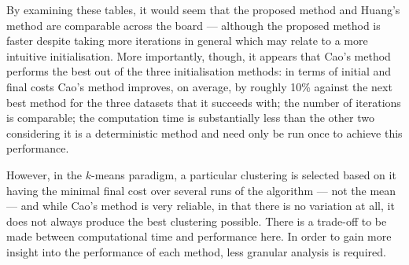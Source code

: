 \begin{table}
    \centering
    \resizebox{\textwidth}{!}{%
        
    }
    \label{tab:breast_cancer_knee}\vspace{2em}

    \resizebox{\textwidth}{!}{%
        
    }
    \label{tab:mushroom_knee}\vspace{2em}

    \resizebox{\textwidth}{!}{%
        
    }
    \label{tab:nursery_knee}\vspace{2em}

    \resizebox{\textwidth}{!}{%
        
    }
    \label{tab:soybean_knee}
\end{table}

By examining these tables, it would seem that the proposed method and Huang's
method are comparable across the board --- although the proposed method is
faster despite taking more iterations in general which may relate to a more
intuitive initialisation. More importantly, though, it appears that Cao's method
performs the best out of the three initialisation methods: in terms of initial
and final costs Cao's method improves, on average, by roughly 10\% against the
next best method for the three datasets that it succeeds with; the number of
iterations is comparable; the computation time is substantially less than the
other two considering it is a deterministic method and need only be run once to
achieve this performance.

However, in the \(k\)-means paradigm, a particular clustering is selected based
on it having the minimal final cost over several runs of the algorithm --- not
the mean --- and while Cao's method is very reliable, in that there is no
variation at all, it does not always produce the best clustering possible. There
is a trade-off to be made between computational time and performance here. In
order to gain more insight into the performance of each method, less granular
analysis is required.


